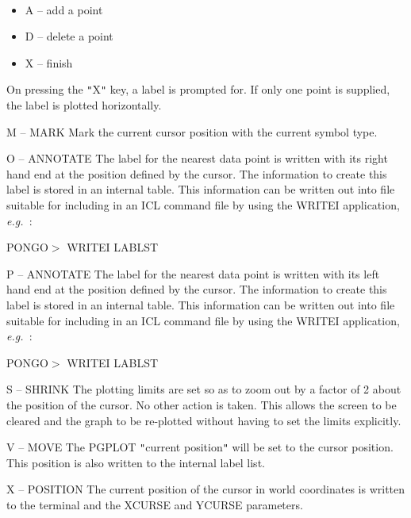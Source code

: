 \documentclass[twoside,11pt]{article}
\renewcommand{\_}{\texttt{\symbol{95}}}
\newcommand{\eg}{{\em e.g.\ }}
\newcommand{\sstitemlist}[1]{
  \mbox{} \\
  \vspace{-3.5ex}
  \begin{itemize}
     #1
  \end{itemize}
}
\newcommand{\sstitem}{\item}
\newcommand{\sstitemlist}[1]{
      \begin{itemize}
         #1
      \end{itemize}
      \\
   }
\newcommand{\sstitem}{\item}
\begin{document}
\begin{sloppypar}
{{{         \sstitemlist{

            \sstitem
                  A -- add a point

            \sstitem
                  D -- delete a point

            \sstitem
                  X -- finish
         }
            On pressing the {\tt "}X{\tt "} key, a label is prompted for. If only
            one point is supplied, the label is plotted horizontally.

         \sstitem
            M -- MARK
            Mark the current cursor position with the current symbol
            type.

         \sstitem
            O -- ANNOTATE
            The label for the nearest data point is written with its
            right hand end at the position defined by the cursor.  The
            information to create this label is stored in an internal
            table. This information can be written out into file
            suitable for including in an ICL command file by using the
            WRITEI application, \eg:

               PONGO$>$ WRITEI LABLST

         \sstitem
            P -- ANNOTATE
            The label for the nearest data point is written with its
            left hand end at the position defined by the cursor.  The
            information to create this label is stored in an internal
            table. This information can be written out into file
            suitable for including in an ICL command file by using the
            WRITEI application, \eg:

               PONGO$>$ WRITEI LABLST

         \sstitem
            S -- SHRINK
            The plotting limits are set so as to zoom out by a factor
            of 2 about the position of the cursor. No other action is
            taken. This allows the screen to be cleared and the graph
            to be re-plotted without having to set the limits
            explicitly.

         \sstitem
            V -- MOVE
            The PGPLOT {\tt "}current position{\tt "} will be set to the cursor
            position. This position is also written to the internal
            label list.

         \sstitem
            X -- POSITION
            The current position of the cursor in world coordinates is
            written to the terminal and the XCURSE and YCURSE
            parameters.

}}}
\end{sloppypar}
\end{document}
